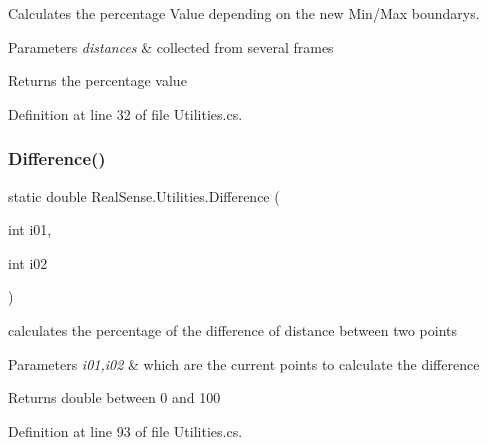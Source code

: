 Calculates the percentage Value depending on the new Min/\+Max boundarys. 
\begin{DoxyParams}{Parameters}
{\em distances} & collected from several frames \\
\hline
\end{DoxyParams}
\begin{DoxyReturn}{Returns}
the percentage value 
\end{DoxyReturn}


Definition at line 32 of file Utilities.\+cs.

\mbox{\label{class_real_sense_1_1_utilities_afb6700357b260189d5309e5c15463ad8}} 
\subsubsection{\texorpdfstring{Difference()}{Difference()}}
{\footnotesize\ttfamily static double Real\+Sense.\+Utilities.\+Difference (\begin{DoxyParamCaption}\item[{int}]{i01,  }\item[{int}]{i02 }\end{DoxyParamCaption})\hspace{0.3cm}{\ttfamily [static]}}

calculates the percentage of the difference of distance between two points 
\begin{DoxyParams}{Parameters}
{\em i01,i02} & which are the current points to calculate the difference \\
\hline
\end{DoxyParams}
\begin{DoxyReturn}{Returns}
double between 0 and 100 
\end{DoxyReturn}


Definition at line 93 of file Utilities.\+cs.

\mbox{\label{class_real_sense_1_1_utilities_a46ab13ced92a5c23b776d553eecb6a8a}} 
